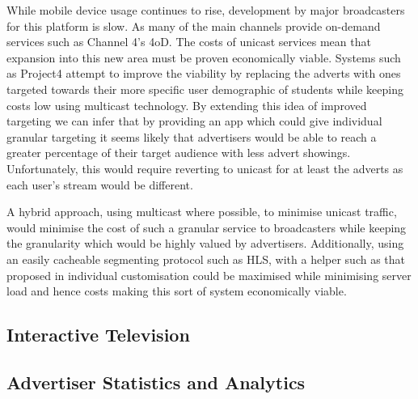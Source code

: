 While mobile device usage continues to rise, development by major broadcasters for this platform is slow. As many of the main channels provide on-demand services such as Channel 4's 4oD. The costs of unicast services mean that expansion into this new area must be proven economically viable. Systems such as Project4 attempt to improve the viability by replacing the adverts with ones targeted towards their more specific user demographic of students while keeping costs low using multicast technology. By extending this idea of improved targeting we can infer that by providing an app which could give individual granular targeting it seems likely that advertisers would be able to reach a greater percentage of their target audience with less advert showings. Unfortunately, this would require reverting to unicast for at least the adverts as each user's stream would be different.

A hybrid approach, using multicast where possible, to minimise unicast traffic, would minimise the cost of such a granular service to broadcasters while keeping the granularity which would be highly valued by advertisers. Additionally, using an easily cacheable segmenting protocol such as HLS\citep{HLS}, with a helper such as that proposed in \citep{cachedStream} individual customisation could be maximised while minimising server load and hence costs making this sort of system economically viable.

\subsection{Interactive Television}



\subsection{Advertiser Statistics and Analytics}
